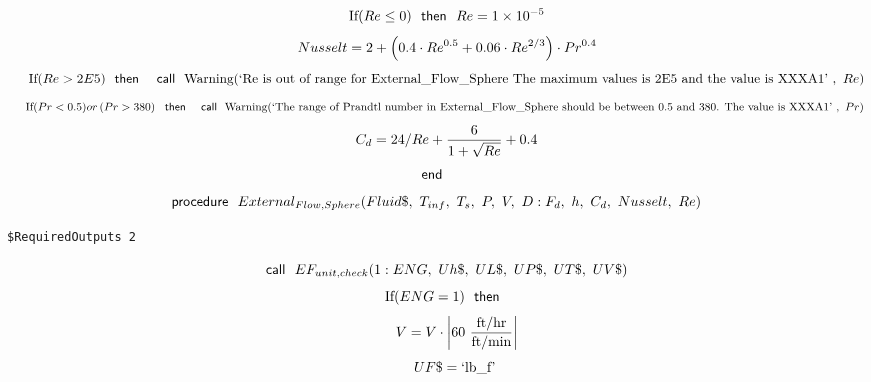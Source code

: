 \documentclass[10pt,fleqn]{article}
\newcommand{\F}[1]{\mbox{$#1$}}
\newcommand{\K}[1]{\mbox{\sf#1\ \ \mit}}
\newcommand{\KS}[1]{\mbox{\sf\ \ #1\ \ \mit}}
\newcommand{\SC}[1]{\mbox{`#1'}\  }
\newcommand{\V}[1]{\mbox{$ #1 $}}
\newcommand{\I}{\mbox{\hspace{0.20in}}}
\begin{document}
\begin{equation}
\I \label{EES Eqn:92}
\mbox{If}{ \left( Re\leq 0 \right) } \KS{then} \V{Re} =1\times 10^{-5} 
\end{equation}
\begin{equation}
\I \label{EES Eqn:93}
\V{Nusselt} =2+ \left( 0.4\cdot \V{Re} ^{0.5}+0.06\cdot \V{Re} ^{2/3} \right) \cdot \V{Pr} ^{0.4} 
\end{equation}
\begin{equation}
\I \label{EES Eqn:94}
\mbox{If}{ \left( \V{Re>2E5}  \right) } \KS{then} \KS{call} \mbox{Warning}{ \left( \SC{Re is out of range for External\_Flow\_Sphere The maximum values is 2E5 and the value is XXXA1},\ \V{Re}  \right) } 
\end{equation}
\begin{equation}
\I \label{EES Eqn:95}
\mbox{If}{ \left( \V{Pr<0.5}  \right) } \V{or}   \left( \V{Pr>380}  \right)  \KS{then} \KS{call} \mbox{Warning}{ \left( \SC{The range of Prandtl number in External\_Flow\_Sphere should be between 0.5 and 380.  The value is XXXA1},\ \V{Pr}  \right) } 
\end{equation}
\begin{equation}
\I \label{EES Eqn:96}
C_{d}=24/\V{Re}+\frac {6}{ 1+\sqrt{  Re  } }+0.4 
\end{equation}
\begin{equation}
\label{EES Eqn:97}
\K{end} 
\end{equation}
\vspace{0.1 in}
\begin{equation}
\label{EES Eqn:98}
\K{procedure} \F{External_{Flow,Sphere}}{ \left( Fluid\$,\ T_{inf},\ T_{s},\ P,\ V,\ D: F_{d},\ h,\ C_{d},\ \V{Nusselt} ,\ \V{Re}  \right) } 
\end{equation}
\begin{verbatim}
$RequiredOutputs 2
\end{verbatim}  \begin{equation}
\I \label{EES Eqn:99}
\K{call} \F{EF_{unit,check}}{ \left( 1:\V{ENG} ,\ Uh\$,\ UL\$,\ UP\$,\ UT\$,\ UV\$ \right) } 
\end{equation}
\begin{equation}
\I \label{EES Eqn:100}
\mbox{If}{ \left( \V{ENG} =1 \right) } \KS{then} 
\end{equation}
\begin{equation}
\I \I \label{EES Eqn:101}
V=V\cdot \rm { \left|60\ \frac {\rm{ft/hr}}{\rm{ft/min}}\right|} 
\end{equation}
\begin{equation}
\I \I \label{EES Eqn:102}
UF\$=\SC{lb\_f} 
\end{equation}
\end{document}
